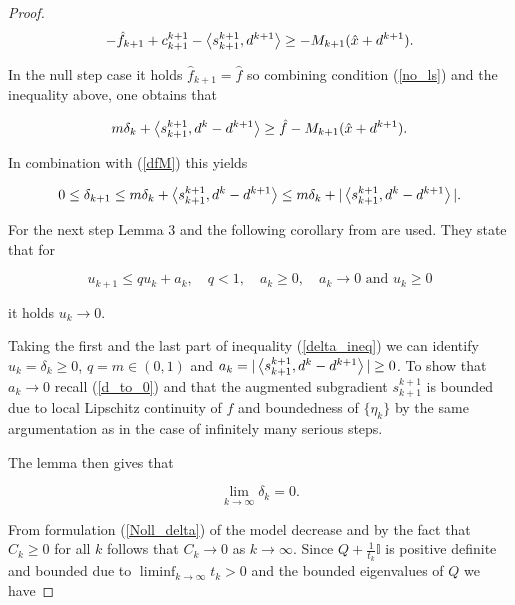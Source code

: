 \begin{proof}
\begin{equation*}
	-\hat{f}_{k+1}+c^{k+1}_{k+1}-\left\langle s^{k+1}_{k+1},d^{k+1}\right\rangle \geq -M_{k+1}(\hat{x}+d^{k+1}).
\end{equation*}

In the null step case it holds \(\hat{f}_{k+1}=\hat{f}\) so combining condition (\ref{no_ls}) and the inequality above, one obtains that

\begin{equation*}
	m\delta_k+\left\langle s^{k+1}_{k+1},d^k-d^{k+1}\right\rangle \geq \hat{f}-M_{k+1}(\hat{x}+d^{k+1}).
\end{equation*}

In combination with (\ref{dfM}) this yields

\begin{equation}
	0 \leq \delta_{k+1} \leq m\delta_k + \left\langle s^{k+1}_{k+1},d^k-d^{k+1}\right\rangle \leq m\delta_k + |\left\langle s^{k+1}_{k+1},d^k-d^{k+1}\right\rangle|.
	\label{delta_ineq}
\end{equation}

For the next step Lemma 3 and the following corollary from \cite{Polyak1987} are used. They state that for

 \begin{equation*}
	u_{k+1} \leq qu_k + a_k, \quad q < 1, \quad a_k \geq 0, \quad a_k \to 0 \text{ and } u_k \geq 0
\end{equation*}

it holds \(u_k \to 0 \).



Taking the first and the last part of inequality (\ref{delta_ineq}) we can identify \(u_k = \delta_k \geq 0\), \(q = m \in (0,1)\) and \(a_k = |\left\langle s^{k+1}_{k+1},d^k-d^{k+1}\right\rangle| \geq 0\). To show that \(a_k \to 0\) recall (\ref{d_to_0}) and that the augmented subgradient \(s^{k+1}_{k+1}\) is bounded due to local Lipschitz continuity of \(f\) and boundedness of \(\{\eta_k\}\) by the same argumentation as in the case of infinitely many serious steps.

The lemma then gives that

\begin{equation*}
	\lim_{k \to \infty} \delta_k = 0.
\end{equation*}

From  formulation (\ref{Noll_delta}) of the model decrease and by the fact that \(C_k \geq 0\) for all \(k\) follows that \(C_k \to 0\) as \(k \to \infty\). Since \(Q+\frac{1}{t_k}\mathbb{I}\) is positive definite and bounded due to \(\liminf_{k \to \infty} t_k > 0\) and the bounded eigenvalues of \(Q\) we have 


\end{proof}
